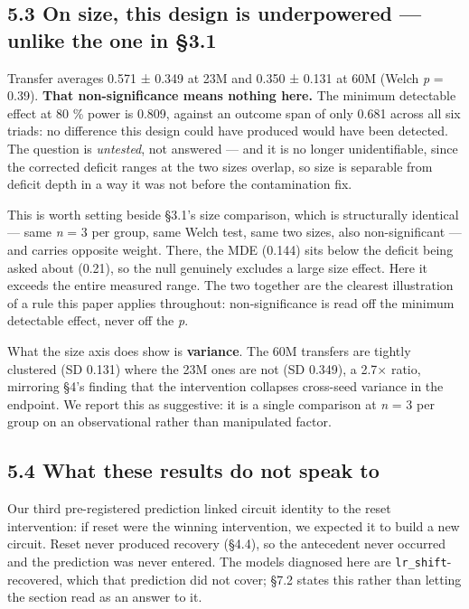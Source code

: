 \documentclass{article}
\begin{document}
\subsection{5.3 On size, this design is underpowered --- unlike the one in §3.1}\label{on-size-this-design-is-underpowered-unlike-the-one-in-3.1}

Transfer averages 0.571 ± 0.349 at 23M and 0.350 ± 0.131 at 60M (Welch \emph{p} = 0.39). \textbf{That
non-significance means nothing here.} The minimum detectable effect at 80 \% power is 0.809,
against an outcome span of only 0.681 across all six triads: no difference this design could
have produced would have been detected. The question is \emph{untested}, not answered --- and it is
no longer unidentifiable, since the corrected deficit ranges at the two sizes overlap, so
size is separable from deficit depth in a way it was not before the contamination fix.

This is worth setting beside §3.1's size comparison, which is structurally identical --- same
\emph{n} = 3 per group, same Welch test, same two sizes, also non-significant --- and carries
opposite weight. There, the MDE (0.144) sits below the deficit being asked about (0.21), so
the null genuinely excludes a large size effect. Here it exceeds the entire measured range.
The two together are the clearest illustration of a rule this paper applies throughout:
non-significance is read off the minimum detectable effect, never off the \emph{p}.

What the size axis does show is \textbf{variance}. The 60M transfers are tightly clustered
(SD 0.131) where the 23M ones are not (SD 0.349), a 2.7× ratio, mirroring §4's finding that
the intervention collapses cross-seed variance in the endpoint. We report this as suggestive:
it is a single comparison at \emph{n} = 3 per group on an observational rather than manipulated
factor.

\subsection{5.4 What these results do not speak to}\label{what-these-results-do-not-speak-to}

Our third pre-registered prediction linked circuit identity to the reset intervention: if
reset were the winning intervention, we expected it to build a new circuit. Reset never
produced recovery (§4.4), so the antecedent never occurred and the prediction was never
entered. The models diagnosed here are \texttt{lr\_shift}-recovered, which that prediction did not
cover; §7.2 states this rather than letting the section read as an answer to it.
\end{document}
